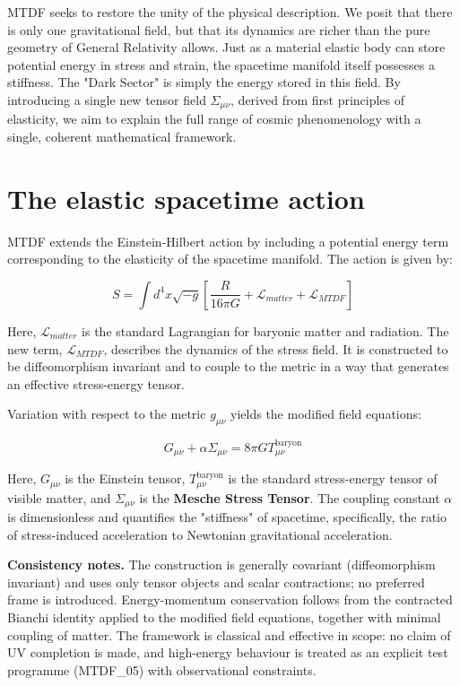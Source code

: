 \documentclass[11pt,a4paper]{article}
\begin{document}
MTDF seeks to restore the unity of the physical description. We posit that there is only one gravitational field, but that its dynamics are richer than the pure geometry of General Relativity allows. Just as a material elastic body can store potential energy in stress and strain, the spacetime manifold itself possesses a stiffness. The "Dark Sector" is simply the energy stored in this field. By introducing a single new tensor field $\Sigma_{\mu\nu}$, derived from first principles of elasticity, we aim to explain the full range of cosmic phenomenology with a single, coherent mathematical framework.

\section{The elastic spacetime action}
\label{sec:sec3}
MTDF extends the Einstein-Hilbert action by including a potential energy term corresponding to the elasticity of the spacetime manifold. The action is given by:

$$ S = \int d^4x \sqrt{-g} \left[ \frac{R}{16\pi G} + \mathcal{L}_{matter} + \mathcal{L}_{MTDF} \right] $$

Here, $\mathcal{L}_{matter}$ is the standard Lagrangian for baryonic matter and radiation. The new term, $\mathcal{L}_{MTDF}$, describes the dynamics of the stress field. It is constructed to be diffeomorphism invariant and to couple to the metric in a way that generates an effective stress-energy tensor.

Variation with respect to the metric $g_{\mu\nu}$ yields the modified field equations:

$$ G_{\mu\nu} + \alpha \Sigma_{\mu\nu} = 8\pi G T_{\mu\nu}^{\text{baryon}} $$

Here, $G_{\mu\nu}$ is the Einstein tensor, $T_{\mu\nu}^{\text{baryon}}$ is the standard stress-energy tensor of visible matter, and $\Sigma_{\mu\nu}$ is the \textbf{Mesche Stress Tensor}. The coupling constant $\alpha$ is dimensionless and quantifies the "stiffness" of spacetime, specifically, the ratio of stress-induced acceleration to Newtonian gravitational acceleration.

\textbf{Consistency notes.} The construction is generally covariant (diffeomorphism invariant) and uses only tensor objects and scalar contractions; no preferred frame is introduced. Energy-momentum conservation follows from the contracted Bianchi identity applied to the modified field equations, together with minimal coupling of matter. The framework is classical and effective in scope: no claim of UV completion is made, and high-energy behaviour is treated as an explicit test programme (MTDF\_\allowbreak{}05) with observational constraints.
\end{document}
